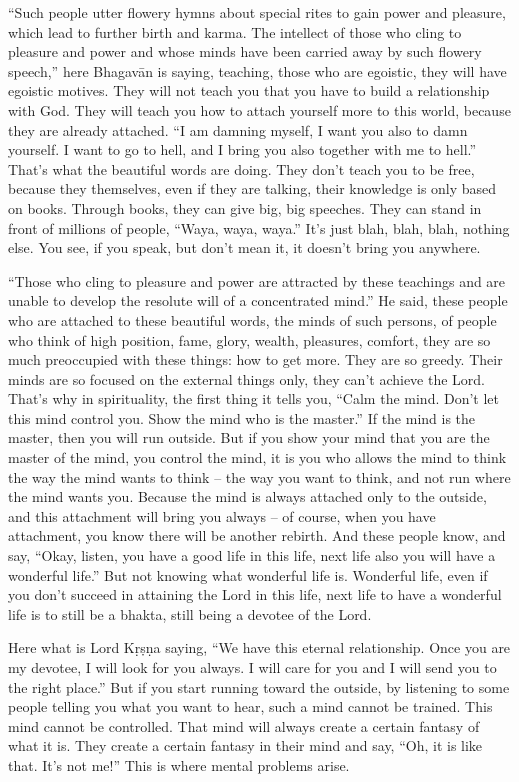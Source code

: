 “Such people utter flowery hymns about special rites to gain power and pleasure, which lead to further birth and karma. The intellect of those who cling to pleasure and power and whose minds have been carried away by such flowery speech,” here Bhagavān is saying, teaching, those who are egoistic, they will have egoistic motives. They will not teach you that you have to build a relationship with God. They will teach you how to attach yourself more to this world, because they are already attached. “I am damning myself, I want you also to damn yourself. I want to go to hell, and I bring you also together with me to hell.” That’s what the beautiful words are doing. They don’t teach you to be free, because they themselves, even if they are talking, their knowledge is only based on books. Through books, they can give big, big speeches. They can stand in front of millions of people, “Waya, waya, waya.” It’s just blah, blah, blah, nothing else. You see, if you speak, but don’t mean it, it doesn’t bring you anywhere.

“Those who cling to pleasure and power are attracted by these teachings and are unable to develop the resolute will of a concentrated mind.” He said, these people who are attached to these beautiful words, the minds of such persons, of people who think of high position, fame, glory, wealth, pleasures, comfort, they are so much preoccupied with these things: how to get more. They are so greedy. Their minds are so focused on the external things only, they can’t achieve the Lord. That’s why in spirituality, the first thing it tells you, “Calm the mind. Don’t let this mind control you. Show the mind who is the master.” If the mind is the master, then you will run outside. But if you show your mind that you are the master of the mind, you control the mind, it is you who allows the mind to think the way the mind wants to think – the way you want to think, and not run where the mind wants you. Because the mind is always attached only to the outside, and this attachment will bring you always – of course, when you have attachment, you know there will be another rebirth. And these people know, and say, “Okay, listen, you have a good life in this life, next life also you will have a wonderful life.” But not knowing what wonderful life is. Wonderful life, even if you don’t succeed in attaining the Lord in this life, next life to have a wonderful life is to still be a bhakta, still being a devotee of the Lord.

Here what is Lord Kṛṣṇa saying, “We have this eternal relationship. Once you are my devotee, I will look for you always. I will care for you and I will send you to the right place.” But if you start running toward the outside, by listening to some people telling you what you want to hear, such a mind cannot be trained. This mind cannot be controlled. That mind will always create a certain fantasy of what it is. They create a certain fantasy in their mind and say, “Oh, it is like that. It’s not me!” This is where mental problems arise.

